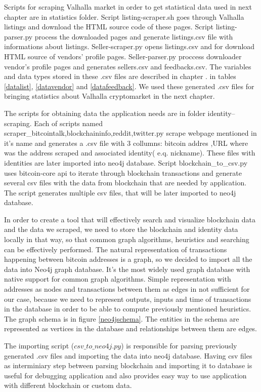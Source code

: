 \documentclass[
  digital, %
  table,   %
  lof,     %
  lot,     %
  oneside
]{fithesis3}
\begin{document}
Scripts for scraping Valhalla market in order to get statistical data used in next chapter are in statistics folder.
Script listing-scraper.sh goes through Valhalla listings and download the HTML source code of these pages.
Script listing-parser.py process the downloaded pages and generate listings.csv file with informations about listings.
Seller-scraper.py opens listings.csv and for download HTML source of vendors' profile pages. 
Seller-parser.py proccess downloader vendor's profile pages and generates sellers.csv and feedbacks.csv.
The variables and data types stored in these .csv files are described in chapter \label{Valhalla cryptomarket webscraping}.
in tables \ref{datalist}, \ref{datavendor} and \ref{datafeedback}. We used these generated .csv files for
bringing statistics about Valhalla cryptomarket in the next chapter.

The scripts for obtaining data the application needs are in folder identity--scraping.
Each of scripts named scraper\_{bitcointalk,blockchaininfo,reddit,twitter}.py scrape webpage mentioned
in it's name and generates a .csv file with 3 collumns: bitcoin addres ,URL where was the address scraped
and associated identity( e.q. nickname). These files with identities are later imported into neo4j database.
Script blockchain\_to\_csv.py uses bitcoin-core api to iterate through blockchain transactions
and generate several csv files with the data from blockchain that are needed by application.
The script generates multiple csv files, that will be later imported to neo4j database.

In order to create a tool that will effectively search and visualize blockchain data and the 
data we scraped, we need to store the blockchain and identity data locally in that way, so that common
graph algorithms, heuristics and searching can be effectively performed.
The natural representation of transactions happening between
bitcoin addresses is a graph, so we decided to import all the data into Neo4j graph database. It's the
most widely used graph database with native support for common graph algorithms.
Simple representation with addresses as nodes and transactions between them as edges in not
sufficient for our case, because we need to represent
outputs, inputs and time of transactions in the database in order to be able to compute previously mentioned heuristics. 
The graph schema is in figure \ref{neo4jschema}. The entities in the schema are represented as vertices
 in the database and relationships between them are edges.

The importing script ($csv\_to\_neo4j.py$) is responsible for parsing
previously generated .csv files and importing the data into neo4j database.
Having csv files as interminiary step between parsing blockchain and importing it to database
is useful for debugging application and also provides easy way to
use application with different blockchain or custom data.
\end{document}

